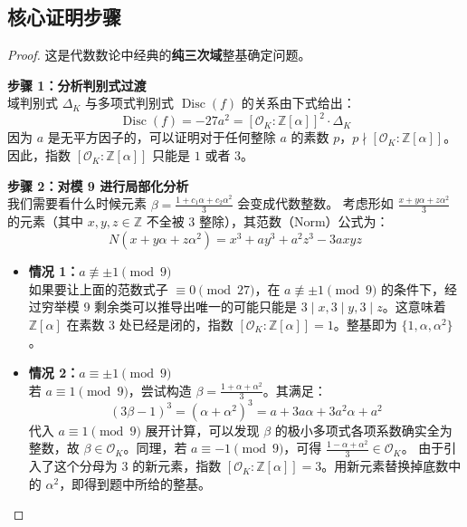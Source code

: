 \documentclass[]{article}
\begin{document}
	\subsection*{核心证明步骤}
	\begin{proof}
		这是代数数论中经典的\textbf{纯三次域}整基确定问题。
		
		\textbf{步骤 1：分析判别式过渡} \\
		域判别式 $\Delta_K$ 与多项式判别式 $\operatorname{Disc}(f)$ 的关系由下式给出：
		\[ \operatorname{Disc}(f) = -27a^2 = [\mathcal{O}_K : \mathbb{Z}[\alpha]]^2 \cdot \Delta_K \]
		因为 $a$ 是无平方因子的，可以证明对于任何整除 $a$ 的素数 $p$，$p \nmid [\mathcal{O}_K : \mathbb{Z}[\alpha]]$。因此，指数 $[\mathcal{O}_K : \mathbb{Z}[\alpha]]$ 只能是 $1$ 或者 $3$。
		
		\textbf{步骤 2：对模 9 进行局部化分析} \\
		我们需要看什么时候元素 $\beta = \frac{1 + c_1\alpha + c_2\alpha^2}{3}$ 会变成代数整数。
		考虑形如 $\frac{x + y\alpha + z\alpha^2}{3}$ 的元素（其中 $x,y,z \in \mathbb{Z}$ 不全被 3 整除），其范数（Norm）公式为：
		\[ N(x+y\alpha+z\alpha^2) = x^3 + ay^3 + a^2z^3 - 3axyz \]
		\begin{itemize}
			\item \textbf{情况 1：$a \not\equiv \pm 1 \pmod 9$} \\
			如果要让上面的范数式子 $\equiv 0 \pmod{27}$，在 $a \not\equiv \pm 1 \pmod 9$ 的条件下，经过穷举模 9 剩余类可以推导出唯一的可能只能是 $3 \mid x, 3 \mid y, 3 \mid z$。这意味着 $\mathbb{Z}[\alpha]$ 在素数 $3$ 处已经是闭的，指数 $[\mathcal{O}_K : \mathbb{Z}[\alpha]] = 1$。整基即为 $\{1, \alpha, \alpha^2\}$。
			
			\item \textbf{情况 2：$a \equiv \pm 1 \pmod 9$} \\
			若 $a \equiv 1 \pmod 9$，尝试构造 $\beta = \frac{1 + \alpha + \alpha^2}{3}$。其满足：
			\[ (3\beta - 1)^3 = (\alpha + \alpha^2)^3 = a + 3a\alpha + 3a^2\alpha + a^2 \]
			代入 $a \equiv 1 \pmod 9$ 展开计算，可以发现 $\beta$ 的极小多项式各项系数确实全为整数，故 $\beta \in \mathcal{O}_K$。同理，若 $a \equiv -1 \pmod 9$，可得 $\frac{1 - \alpha + \alpha^2}{3} \in \mathcal{O}_K$。
			由于引入了这个分母为 $3$ 的新元素，指数 $[\mathcal{O}_K : \mathbb{Z}[\alpha]] = 3$。用新元素替换掉底数中的 $\alpha^2$，即得到题中所给的整基。
		\end{itemize}
	\end{proof}
	
	\pagebreak
	
\end{document}
